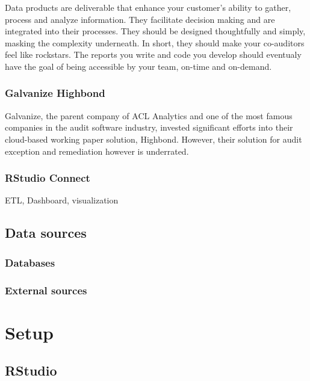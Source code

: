 \documentclass[
]{book}
\begin{document}
Data products are deliverable that enhance your customer's ability to gather, process and analyze information. They facilitate decision making and are integrated into their processes. They should be designed thoughtfully and simply, masking the complexity underneath. In short, they should make your co-auditors feel like rockstars. The reports you write and code you develop should eventualy have the goal of being accessible by your team, on-time and on-demand.

\hypertarget{galvanize-highbond}{%
\subsection{Galvanize Highbond}\label{galvanize-highbond}}

Galvanize, the parent company of ACL Analytics and one of the most famous companies in the audit software industry, invested significant efforts into their cloud-based working paper solution, Highbond. However, their solution for audit exception and remediation however is underrated.

\hypertarget{rstudio-connect}{%
\subsection{RStudio Connect}\label{rstudio-connect}}

ETL, Dashboard, visualization

\hypertarget{data-sources}{%
\section{Data sources}\label{data-sources}}

\hypertarget{databases}{%
\subsection{Databases}\label{databases}}

\hypertarget{external-sources}{%
\subsection{External sources}\label{external-sources}}

\hypertarget{setup}{%
\chapter{Setup}\label{setup}}

\hypertarget{rstudio}{%
\section{RStudio}\label{rstudio}}
\end{document}
